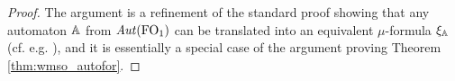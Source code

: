 \begin{proof}
The argument  is a refinement of the standard proof showing that any automaton 
$\mathbb{A}$ from $\mathit{Aut}(\mathrm{FO}_1)$ can be translated into an equivalent $\mu$-formula 
$\xi_\mathbb{A}$ (cf. e.g. \cite[Section 6]{Ven08}), and it is essentially a special case of the argument proving Theorem \ref{thm:wmso_autofor}.



%
%
%



\end{proof}
